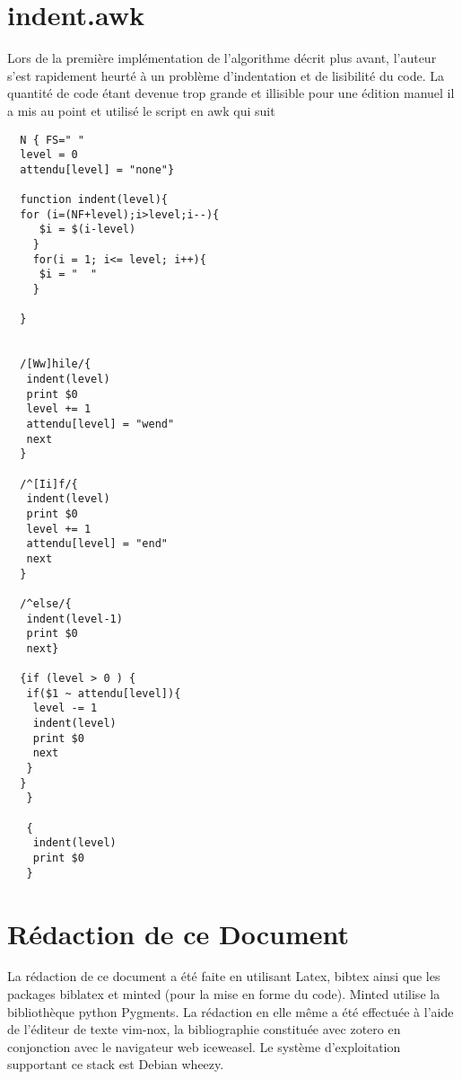 \documentclass[11pt]{report}
\begin{document}
\section{indent.awk}
Lors de la première implémentation de l'algorithme décrit plus avant, l'auteur s'est rapidement heurté à un problème d'indentation et de lisibilité du code. La quantité de code étant devenue trop grande et illisible pour une édition manuel il a mis au point et utilisé le script en awk\cite{awk} qui suit
\begin{verbatim}
  N { FS=" " 
  level = 0
  attendu[level] = "none"}
  
  function indent(level){
  for (i=(NF+level);i>level;i--){
     $i = $(i-level)
    }
    for(i = 1; i<= level; i++){
     $i = "  "
    }
  
  }
  
  
  /[Ww]hile/{
   indent(level)
   print $0
   level += 1
   attendu[level] = "wend"
   next
  }
  
  /^[Ii]f/{
   indent(level)
   print $0
   level += 1
   attendu[level] = "end"
   next
  }
  
  /^else/{
   indent(level-1)
   print $0
   next}
  
  {if (level > 0 ) {
   if($1 ~ attendu[level]){
    level -= 1
    indent(level)
    print $0
    next
   }
  }
   }
  
   {
  	indent(level)
  	print $0
   }
\end{verbatim}
\section{Rédaction de ce Document}
La rédaction de ce document a été faite en utilisant Latex\cite{latex}, bibtex\cite{bibtex} ainsi que les packages biblatex\cite{biblatex} et minted\cite{minted} (pour la mise en forme du code).
Minted utilise la bibliothèque python Pygments\cite{Pygments}.
 La rédaction en elle même a été effectuée à l'aide de l'éditeur de texte vim-nox\cite{vimnox}, la bibliographie constituée avec zotero\cite{zotero} en conjonction avec le navigateur web iceweasel.
 Le système d'exploitation supportant ce stack est Debian wheezy\cite{debian}.

\printbibliography
\end{document}
